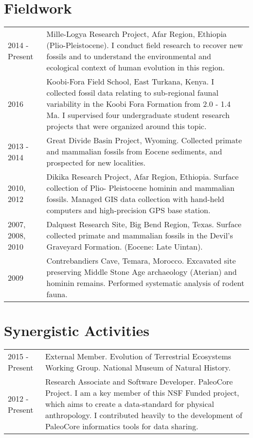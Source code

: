 \documentclass{article}
\begin{document}
\section*{Fieldwork }
\begin{longtable}{p{}p{}}
2014 - Present & Mille-Logya Research Project, Afar Region, Ethiopia (Plio-Pleistocene). I conduct field research to recover new fossils and to understand the environmental and ecological context of human evolution in this region. \\[4pt]

2016 & Koobi-Fora Field School, East Turkana, Kenya. I collected fossil data relating to sub-regional faunal variability in the Koobi Fora Formation from 2.0 - 1.4 Ma. I supervised four undergraduate student research projects that were organized around this topic. \\[4pt]


2013 - 2014 & Great Divide Basin Project, Wyoming. Collected primate and mammalian fossils from Eocene sediments, and prospected for new localities. \\[4pt]

2010, 2012 & Dikika Research Project, Afar Region, Ethiopia. Surface collection of Plio- Pleistocene hominin and mammalian fossils. Managed GIS data collection with hand-held computers and high-precision GPS base station.\\[4pt]

2007, 2008, 2010 & Dalquest Research Site, Big Bend Region, Texas. Surface collected primate and mammalian fossils in the Devil's Graveyard Formation. (Eocene: Late Uintan).\\[4pt]

2009 & Contrebandiers Cave, Temara, Morocco.  Excavated site preserving Middle Stone Age archaeology (Aterian) and hominin remains. Performed systematic analysis of rodent fauna.\\
\end{longtable}

\section*{Synergistic Activities}
\begin{tabular}{p{}p{}}

2015 - Present & External Member. Evolution of Terrestrial Ecosystems Working Group. National Museum of Natural History.\\[4pt]

2012 - Present & Research Associate and Software Developer. PaleoCore Project. I am a key member of this NSF Funded project, which aims to create a data-standard for physical anthropology. I contributed heavily to the development of PaleoCore informatics tools for data sharing.\\
\end{tabular}
\end{document}
